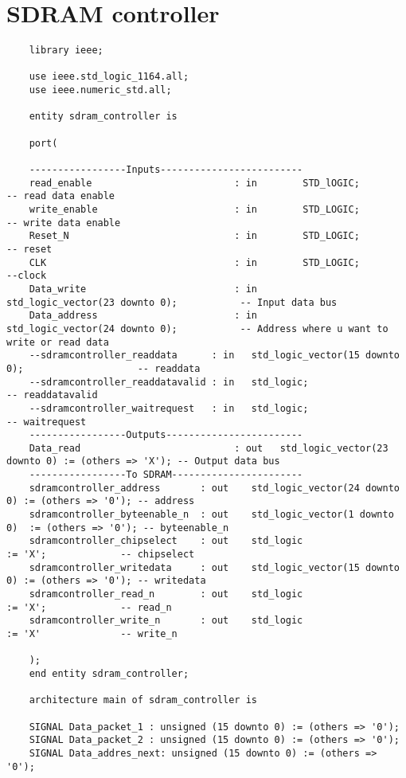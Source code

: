 \section*{SDRAM controller}
\begin{lstlisting}  
    library ieee;

    use ieee.std_logic_1164.all;
    use ieee.numeric_std.all;
    
    entity sdram_controller is
    
    port(
    
    -----------------Inputs-------------------------
    read_enable							: in		STD_lOGIC;								 -- read data enable
    write_enable						: in 		STD_LOGIC;								 -- write data enable
    Reset_N								: in 		STD_LOGIC;								 -- reset
    CLK									: in		STD_LOGIC;								 --clock
    Data_write							: in 		std_logic_vector(23 downto 0);			 -- Input data bus
    Data_address						: in 		std_logic_vector(24 downto 0);			 -- Address where u want to write or read data
    --sdramcontroller_readdata      : in   std_logic_vector(15 downto 0);                    -- readdata
    --sdramcontroller_readdatavalid : in   std_logic;                                        -- readdatavalid
    --sdramcontroller_waitrequest   : in   std_logic;                                        -- waitrequest
    -----------------Outputs------------------------
    Data_read							: out 	std_logic_vector(23 downto 0) := (others => 'X'); -- Output data bus
    -----------------To SDRAM-----------------------
    sdramcontroller_address       : out    std_logic_vector(24 downto 0) := (others => '0'); -- address
    sdramcontroller_byteenable_n  : out    std_logic_vector(1 downto 0)  := (others => '0'); -- byteenable_n
    sdramcontroller_chipselect    : out    std_logic                     := 'X';             -- chipselect
    sdramcontroller_writedata     : out    std_logic_vector(15 downto 0) := (others => '0'); -- writedata
    sdramcontroller_read_n        : out    std_logic                     := 'X';             -- read_n
    sdramcontroller_write_n       : out    std_logic                     := 'X'              -- write_n
    
    );
    end entity sdram_controller;
    
    architecture main of sdram_controller is 
    
    SIGNAL Data_packet_1 : unsigned (15 downto 0) := (others => '0');
    SIGNAL Data_packet_2 : unsigned (15 downto 0) := (others => '0');
    SIGNAL Data_addres_next: unsigned (15 downto 0) := (others => '0');
    

\end{lstlisting}
